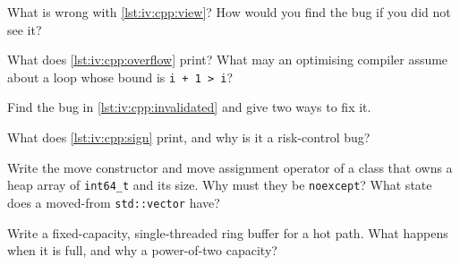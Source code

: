 \begin{interviewq}\label{iq:iv:cpp:7}
What is wrong with \cref{lst:iv:cpp:view}? How would you find the bug if you did not see it?
\end{interviewq}

\label{lst:iv:cpp:overflow}

\begin{interviewq}\label{iq:iv:cpp:8}
What does \cref{lst:iv:cpp:overflow} print? What may an optimising compiler assume about a loop whose bound is \texttt{i + 1 >
i}?
\end{interviewq}

\label{lst:iv:cpp:invalidated}

\begin{interviewq}\label{iq:iv:cpp:9}
Find the bug in \cref{lst:iv:cpp:invalidated} and give two ways to fix it.
\end{interviewq}

\label{lst:iv:cpp:sign}

\begin{interviewq}\label{iq:iv:cpp:10}
What does \cref{lst:iv:cpp:sign} print, and why is it a risk-control bug?
\end{interviewq}

\begin{interviewq}\label{iq:iv:cpp:11}
Write the move constructor and move assignment operator of a class that owns a heap array of \texttt{int64\_t} and its size.
Why must they be \texttt{noexcept}? What state does a moved-from \texttt{std::vector} have?
\end{interviewq}

\begin{interviewq}\label{iq:iv:cpp:12}
Write a fixed-capacity, single-threaded ring buffer for a hot path. What happens when it is full, and why a power-of-two
capacity?
\end{interviewq}

